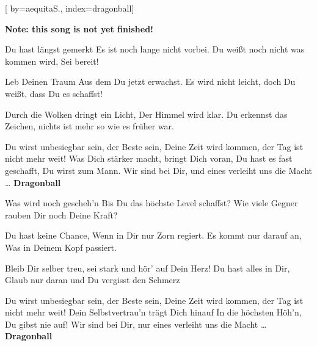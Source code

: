 

[%
    by={aequitaS.},
    index={dragonball}]


    \label{dragonball}

    \textbf{Note: this song is not yet finished!}

    \beginverse
        Du hast l\"{a}ngst gemerkt
        Es ist noch lange nicht vorbei.
        Du wei\ss{}t noch nicht was kommen wird,
        Sei bereit!

        Leb Deinen Traum
        Aus dem Du jetzt erwachst.
        Es wird nicht leicht,
        doch Du wei\ss{}t, dass Du es schaffst!
    \endverse

    \beginverse*
        Durch die Wolken dringt ein Licht,
        Der Himmel wird klar.
        Du erkennst das Zeichen,
        nichts ist mehr so wie es fr\"{u}her war.
    \endverse

    \beginchorus
        Du wirst unbesiegbar sein, der Beste sein,
        Deine Zeit wird kommen, der Tag ist nicht mehr weit!
        Was Dich st\"{a}rker macht, bringt Dich voran,
        Du hast es fast geschafft, Du wirst zum Mann.
        Wir sind bei Dir, und eines verleiht uns die Macht \ldots
        \textbf{Dragonball}
    \endchorus

    \beginverse
        Was wird noch gescheh'n
        Bis Du das h\"{o}chste Level schaffst?
        Wie viele Gegner rauben
        Dir noch Deine Kraft?

        Du hast keine Chance,
        Wenn in Dir nur Zorn regiert.
        Es kommt nur darauf an,
        Was in Deinem Kopf passiert.
    \endverse

    \beginverse*
        Bleib Dir selber treu, sei stark
        und h\"{o}r' auf Dein Herz!
        Du hast alles in Dir,
        Glaub nur daran und Du vergisst den Schmerz
    \endverse

    \beginchorus
        Du wirst unbesiegbar sein, der Beste sein,
        Deine Zeit wird kommen, der Tag ist nicht mehr weit!
        Dein Selbstvertrau'n tr\"{a}gt Dich hinauf
        In die h\"{o}chsten H\"{o}h'n, Du gibst nie auf!
        Wir sind bei Dir, nur eines verleiht uns die Macht \ldots
        \textbf{Dragonball}
    \endchorus
\endsong
